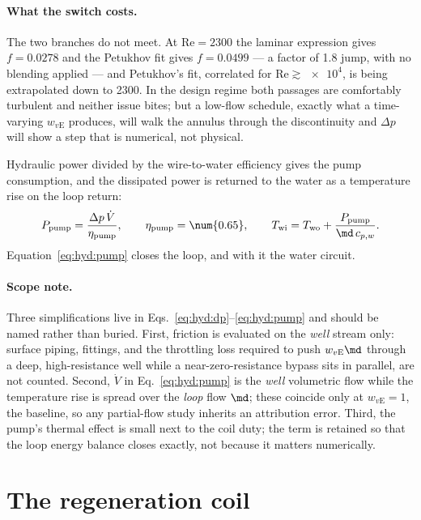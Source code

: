 \paragraph{What the switch costs.} The two branches do not meet. At $\mathrm{Re}=2300$ the
laminar expression gives $f=\num{0.0278}$ and the Petukhov fit gives $f=\num{0.0499}$ --- a
factor of \num{1.8} jump, with no blending applied --- and Petukhov's fit, correlated for
$\mathrm{Re}\gtrsim\num{e4}$, is being extrapolated down to \num{2300}. In the design regime
both passages are comfortably turbulent and neither issue bites; but a low-flow schedule,
exactly what a time-varying $w_{v\mathrm{E}}$ produces, will walk the annulus through the
discontinuity and $\Delta p$ will show a step that is numerical, not physical.

Hydraulic power divided by the wire-to-water efficiency gives the pump consumption, and the
dissipated power is returned to the water as a temperature rise on the loop return:
\begin{equation}
P_{\mathrm{pump}}=\frac{\Delta p\,\dot V}{\eta_{\mathrm{pump}}},
\qquad \eta_{\mathrm{pump}}=\num{0.65},
\qquad
T_{\mathrm{wi}}=T_{\mathrm{wo}}+\frac{P_{\mathrm{pump}}}{\md\,c_{p,w}} .
\label{eq:hyd:pump}
\end{equation}
Equation~\eqref{eq:hyd:pump} closes the loop, and with it the water circuit.

\paragraph{Scope note.} Three simplifications live in
Eqs.~\eqref{eq:hyd:dp}--\eqref{eq:hyd:pump} and should be named rather than buried. First,
friction is evaluated on the \emph{well} stream only: surface piping, fittings, and the
throttling loss required to push $w_{v\mathrm{E}}\md$ through a deep, high-resistance well
while a near-zero-resistance bypass sits in parallel, are not counted. Second, $\dot V$ in
Eq.~\eqref{eq:hyd:pump} is the \emph{well} volumetric flow while the temperature rise is spread
over the \emph{loop} flow $\md$; these coincide only at $w_{v\mathrm{E}}=1$, the baseline, so
any partial-flow study inherits an attribution error. Third, the pump's thermal effect is small
next to the coil duty; the term is retained so that the loop energy balance closes exactly, not
because it matters numerically.

\section{The regeneration coil}
\label{sec:hyd:coil}

